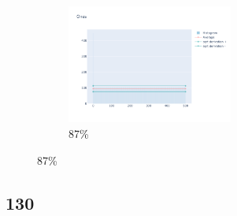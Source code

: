 \documentclass[12pt, fleqn]{report}                             %
\theoremstyle{break}                                            %
\begin{document}
\begin{figure}[ht!]
\begin{subfigure}[b]{0.4\linewidth}
          \includegraphics[width=0.6\textwidth]{Images/108/dia-d.png}
          \caption{87\%}
        \end{subfigure}
      \end{figure}


      \clearpage
      \subsection{130}
\end{document}

